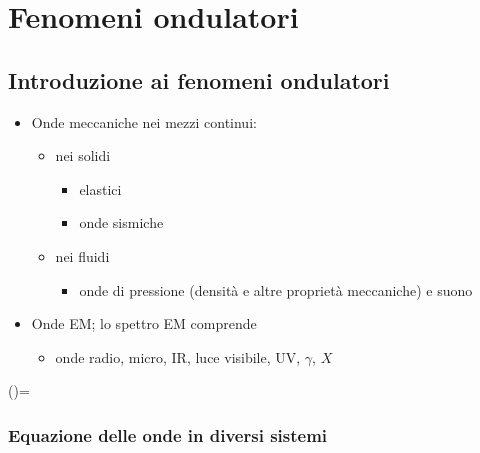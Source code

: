 \documentclass[letterpaper,10pt,italian]{jupyterBook}
\begin{document}
\sphinxstepscope


\part{Fenomeni ondulatori}

\sphinxstepscope


\chapter{Introduzione ai fenomeni ondulatori}
\label{\detokenize{ch/waves/intro:introduzione-ai-fenomeni-ondulatori}}\label{\detokenize{ch/waves/intro:physics-hs-waves-intro}}\label{\detokenize{ch/waves/intro::doc}}\begin{itemize}
\item {} 
\sphinxAtStartPar
Onde meccaniche nei mezzi continui:
\begin{itemize}
\item {} 
\sphinxAtStartPar
nei solidi
\begin{itemize}
\item {} 
\sphinxAtStartPar
elastici

\item {} 
\sphinxAtStartPar
onde sismiche

\end{itemize}

\item {} 
\sphinxAtStartPar
nei fluidi
\begin{itemize}
\item {} 
\sphinxAtStartPar
onde di pressione (densità e altre proprietà meccaniche) e suono

\end{itemize}

\end{itemize}

\item {} 
\sphinxAtStartPar
Onde EM; lo spettro EM comprende
\begin{itemize}
\item {} 
\sphinxAtStartPar
onde radio, micro, IR, luce visibile, UV, \(\gamma\), \(X\)

\end{itemize}

\end{itemize}

\sphinxAtStartPar
()=


\section{Equazione delle onde in diversi sistemi}
\label{\detokenize{ch/waves/intro:equazione-delle-onde-in-diversi-sistemi}}
\end{document}
